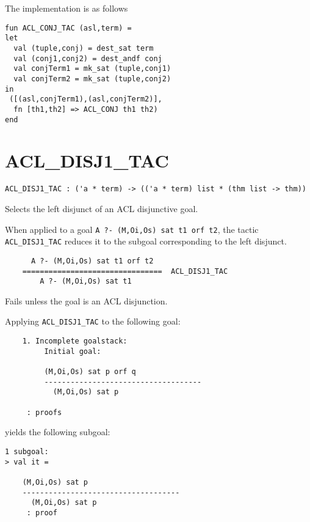 \IMPLEMENTATION
The implementation is as follows
\begin{holboxed}
\begin{verbatim}
fun ACL_CONJ_TAC (asl,term) =
let
  val (tuple,conj) = dest_sat term
  val (conj1,conj2) = dest_andf conj
  val conjTerm1 = mk_sat (tuple,conj1)
  val conjTerm2 = mk_sat (tuple,conj2)
in
 ([(asl,conjTerm1),(asl,conjTerm2)], 
  fn [th1,th2] => ACL_CONJ th1 th2)
end
\end{verbatim}
\end{holboxed}

\SEEALSO
\ENDDOC

\section{ACL\_DISJ1\_TAC}



\small{
\begin{lstlisting}[breaklines]
ACL_DISJ1_TAC : ('a * term) -> (('a * term) list * (thm list -> thm))
\end{lstlisting}}\egroup


\SYNOPSIS
Selects the left disjunct of an ACL disjunctive goal.

\DESCRIBE When applied to a goal \texttt{A ?- (M,Oi,Os) sat t1 orf t2}, the tactic \texttt{ACL\_DISJ1\_TAC} reduces it to the subgoal corresponding to the left disjunct.
\begin{verbatim}
      A ?- (M,Oi,Os) sat t1 orf t2
    ================================  ACL_DISJ1_TAC
        A ?- (M,Oi,Os) sat t1
\end{verbatim}

\FAILURE 
Fails unless the goal is an ACL disjunction.

\EXAMPLE
Applying \texttt{ACL\_DISJ1\_TAC} to the following goal:
\begin{holboxed}
\begin{verbatim}
    1. Incomplete goalstack:
         Initial goal:
    
         (M,Oi,Os) sat p orf q
         ------------------------------------
           (M,Oi,Os) sat p
    
     : proofs
\end{verbatim}
\end{holboxed}
yields the following subgoal:
\begin{holboxed}
\begin{verbatim}
1 subgoal:
> val it =
    
    (M,Oi,Os) sat p
    ------------------------------------
      (M,Oi,Os) sat p
     : proof
\end{verbatim}
\end{holboxed}

